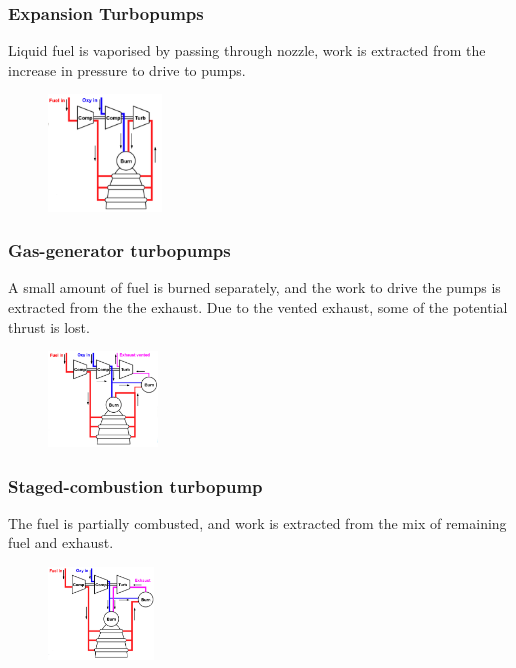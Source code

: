 \documentclass[a4paper,10pt]{article}
\begin{document}
\begin{multicols}{4}
\subsubsection{Expansion Turbopumps}
Liquid fuel is vaporised by passing through nozzle, work is extracted from the increase in pressure to drive to pumps. 
\begin{figure}[H]
    \centering
    \includegraphics[width=0.27\textwidth]{Figure/turbopump1.png}
\end{figure}

\subsubsection{Gas-generator turbopumps}
A small amount of fuel is burned separately, and the work to drive the pumps is extracted from the the exhaust. Due to the vented exhaust, some of the potential thrust is lost. 
\begin{figure}[H]
    \centering
    \includegraphics[width=0.26\textwidth]{Figure/turbopump.png}
\end{figure}

\subsubsection{Staged-combustion turbopump}
The fuel is partially combusted, and work is extracted from the mix of remaining fuel and exhaust.
\vspace*{2cm}
\begin{figure}[H]
    \centering
    \includegraphics[width=0.25\textwidth]{Figure/staged1.png}
\end{figure}


\end{multicols}
\end{document}
